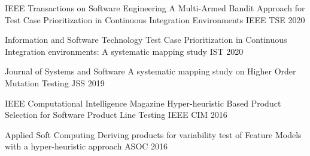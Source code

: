 

\begin{cventries}
	\cventry
	{IEEE Transactions on Software Engineering} %
	{A Multi-Armed Bandit Approach for Test Case Prioritization in Continuous Integration Environments} %
	{IEEE TSE} %
	{2020} %
	{}
	
	
	\cventry
	{Information and Software Technology} %
	{Test Case Prioritization in Continuous Integration environments: A systematic mapping study} %
	{IST} %
	{2020} %
	{}
	
		
	\cventry
	{Journal of Systems and Software} %
	{A systematic mapping study on Higher Order Mutation Testing} %
	{JSS} %
	{2019} %
	{}
	
	\cventry
	{IEEE Computational Intelligence Magazine} %
	{Hyper-heuristic Based Product Selection for Software Product Line Testing} %
	{IEEE CIM} %
	{2016} %
	{}
	
	\cventry
	{Applied Soft Computing} %
	{Deriving products for variability test of Feature Models with a hyper-heuristic approach} %
	{ASOC} %
	{2016} %
	{}
	
\end{cventries}



